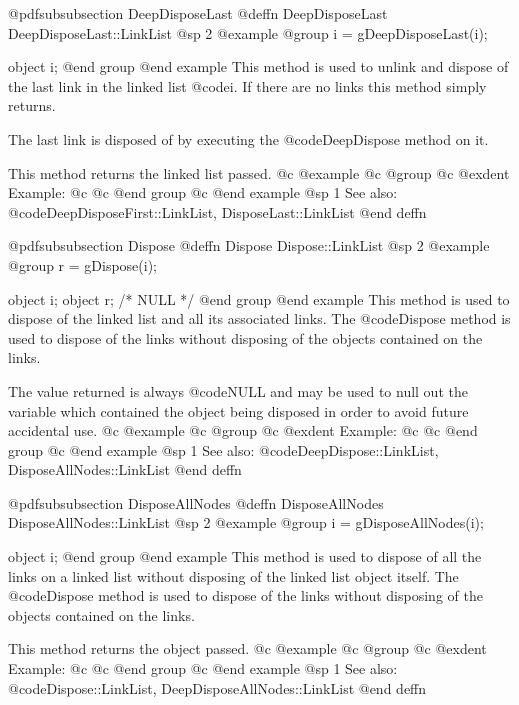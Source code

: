 @pdfsubsubsection {DeepDisposeLast}
@deffn {DeepDisposeLast} DeepDisposeLast::LinkList
@sp 2
@example
@group
i = gDeepDisposeLast(i);

object  i;
@end group
@end example
This method is used to unlink and dispose of the last link in the
linked list @code{i}.  If there are no links this method simply
returns.

The last link is disposed of by executing the @code{DeepDispose}
method on it.

This method returns the linked list passed.
@c @example
@c @group
@c @exdent Example:
@c 
@c @end group
@c @end example
@sp 1
See also:  @code{DeepDisposeFirst::LinkList, DisposeLast::LinkList}
@end deffn








@pdfsubsubsection {Dispose}
@deffn {Dispose} Dispose::LinkList
@sp 2
@example
@group
r = gDispose(i);

object  i;
object  r;     /*  NULL  */
@end group
@end example
This method is used to dispose of the linked list and all its associated
links.  The @code{Dispose} method is used to dispose of the links
without disposing of the objects contained on the links.

The value returned is always @code{NULL} and may be used to null out
the variable which contained the object being disposed in order to
avoid future accidental use.
@c @example
@c @group
@c @exdent Example:
@c 
@c @end group
@c @end example
@sp 1
See also:  @code{DeepDispose::LinkList, DisposeAllNodes::LinkList}
@end deffn










@pdfsubsubsection {DisposeAllNodes}
@deffn {DisposeAllNodes} DisposeAllNodes::LinkList
@sp 2
@example
@group
i = gDisposeAllNodes(i);

object  i;
@end group
@end example
This method is used to dispose of all the links on a linked list without
disposing of the linked list object itself.  The @code{Dispose} method
is used to dispose of the links without disposing of the objects
contained on the links.

This method returns the object passed.
@c @example
@c @group
@c @exdent Example:
@c 
@c @end group
@c @end example
@sp 1
See also:  @code{Dispose::LinkList, DeepDisposeAllNodes::LinkList}
@end deffn












